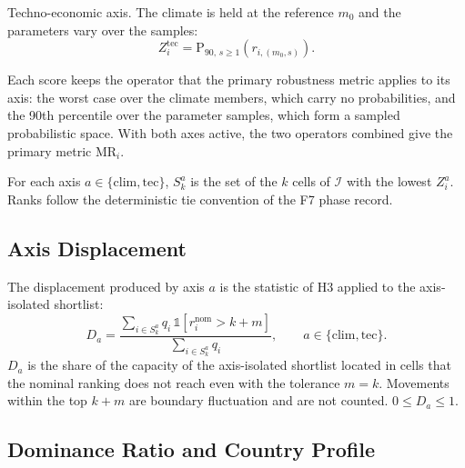 Techno-economic axis. The climate is held at the reference $m_0$ and the
parameters vary over the samples:
\begin{equation}
    Z^{\mathrm{tec}}_i=\mathrm{P}_{90,\,s\geq1}\!\left(r_{i,(m_0,s)}\right) .
    \label{eq:h4_tec_score}
\end{equation}

Each score keeps the operator that the primary robustness metric applies to its
axis: the worst case over the climate members, which carry no probabilities,
and the 90th percentile over the parameter samples, which form a sampled
probabilistic space. With both axes active, the two operators combined give the
primary metric $\mathrm{MR}_i$.

For each axis $a\in\{\mathrm{clim},\mathrm{tec}\}$, $S^{a}_k$ is the set of the
$k$ cells of $\mathcal{I}$ with the lowest $Z^{a}_i$. Ranks follow the
deterministic tie convention of the F7 phase record.

\subsection{Axis Displacement}
\label{subsec:h4_displacement}

The displacement produced by axis $a$ is the statistic of H3 applied to the
axis-isolated shortlist:
\begin{equation}
    D_a=\frac{\sum_{i\in S^{a}_k}q_i\,\mathbb{1}\!\left[r^{\mathrm{nom}}_i>k+m\right]}
    {\sum_{i\in S^{a}_k}q_i},
    \qquad a\in\{\mathrm{clim},\mathrm{tec}\}.
    \label{eq:h4_displacement}
\end{equation}
$D_a$ is the share of the capacity of the axis-isolated shortlist located in
cells that the nominal ranking does not reach even with the tolerance $m=k$.
Movements within the top $k+m$ are boundary fluctuation and are not counted.
$0\leq D_a\leq1$.

\subsection{Dominance Ratio and Country Profile}
\label{subsec:h4_profile}

